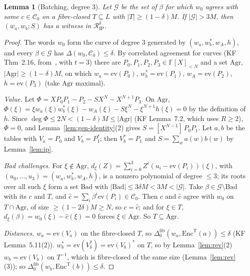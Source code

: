 \documentclass[11pt]{article}
\newtheorem{lemma}[theorem]{Lemma}
\theoremstyle{definition}
\newcommand{\F}{\mathbb{F}}
\newcommand{\coef}[2]{[X^{#1}]\,#2}
\newcommand{\ev}{\mathrm{ev}}
\newcommand{\Cc}{\mathcal{C}}
\begin{document}
\begin{lemma}[Batching, degree $3$]\label{lem:batch3}
Let $\mathcal G$ be the set of $\beta$ for which $w_0$ agrees with some $c\in\Cc_0$ on a fibre-closed $T\subseteq L$ with $|T|\ge(1-\delta)M$.
If $|\mathcal G|>3M$, then $(w_a,w_b;S)$ has a witness in $\mathcal R^\delta_{\mathrm{IP}}$.
\end{lemma}
\begin{proof}
The words $w_0$ form the curve of degree $3$ generated by $(w_a,w_b^\ast,w_A,h)$, and every $\beta\in\mathcal G$ has $\Delta(w_0,\Cc_0)\le\delta$.
By correlated agreement for curves (KF Thm~2.16, from~\cite{BCIKS23}, with $t=3$) there are $P_0,P_1,P_2,P_3\in\F[X]_{<N}$ and a set $\mathrm{Agr}$, $|\mathrm{Agr}|\ge(1-\delta)M$, on which $w_a=\ev(P_0)$, $w_b^\ast=\ev(P_1)$, $w_A=\ev(P_2)$, $h=\ev(P_3)$ (take $\mathrm{Agr}$ maximal).

\emph{Value.} Let $\Phi=XP_0P_1-P_2-SX^N-X^{N+1}P_3$. On $\mathrm{Agr}$, $\Phi(\xi)=\xi w_a(\xi)w_b^\ast(\xi)-w_A(\xi)-S\xi^N-\xi^{N+1}h(\xi)=0$ by the definition of $h$. Since $\deg\Phi\le2N<(1-\delta)M\le|\mathrm{Agr}|$ (KF Lemma~7.2, which uses $R\ge2$), $\Phi=0$, and Lemma~\ref{lem:gen-identity}(2) gives $S=\coef{N-1}{P_0P_1}$.
Let $a,b$ be the tables with $V_a=P_0$ and $V_b=P_1^\ast$; then $V_b^\ast=P_1$ and $S=\sum_wa(w)b(w)$ by Lemma~\ref{lem:ip}.

\emph{Bad challenges.} For $\xi\notin\mathrm{Agr}$, $d_\xi(Z)=\sum_{i=0}^3Z^i(u_i-\ev(P_i))(\xi)$, with $(u_0,\dots,u_3)=(w_a,w_b^\ast,w_A,h)$, is a nonzero polynomial of degree $\le3$; its roots over all such $\xi$ form a set $\mathrm{Bad}$ with $|\mathrm{Bad}|\le3\delta M<3M<|\mathcal G|$.
Take $\beta\in\mathcal G\setminus\mathrm{Bad}$ with its $c$ and $T$, and $\hat c=\sum_i\beta^i\ev(P_i)\in\Cc_0$.
Then $c$ and $\hat c$ agree with $w_0$ on $T\cap\mathrm{Agr}$, of size $\ge(1-2\delta)M\ge N$, so $c=\hat c$; and for $\xi\in T$, $d_\xi(\beta)=w_0(\xi)-\hat c(\xi)=0$ forces $\xi\in\mathrm{Agr}$. So $T\subseteq\mathrm{Agr}$.

\emph{Distances.} $w_a=\ev(V_a)$ on the fibre-closed $T$, so $\Delta^{\mathrm{fib}}_0(w_a,\mathrm{Enc}^{\mathrm T}(a))\le\delta$ (KF Lemma~5.11(2)).
$w_b^\ast=\ev(V_b^\ast)=\ev(V_b)^\ast$ on $T$, so by Lemma~\ref{lem:rev}(2) $w_b=\ev(V_b)$ on $T^{-1}$, which is fibre-closed of the same size (Lemma~\ref{lem:rev}(3)); so $\Delta^{\mathrm{fib}}_0(w_b,\mathrm{Enc}^{\mathrm T}(b))\le\delta$.
\end{proof}
\end{document}
